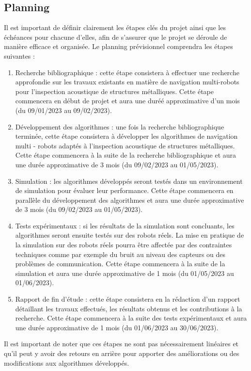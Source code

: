\documentclass[init,francais,RandD]{rapportPFE}  %
\begin{document}
		\subsection{Planning}
			Il est important de définir clairement les étapes clés du projet ainsi que les échéances pour chacune d'elles, afin de s'assurer que le projet se déroule de manière efficace et organisée. Le planning prévisionnel comprendra les étapes suivantes :
			\begin{enumerate}
				\item Recherche bibliographique : cette étape consistera à effectuer une recherche approfondie sur les travaux existants en matière de navigation multi-robots pour l'inspection acoustique de structures métalliques. Cette étape commencera en début de projet et aura une duréé approximative d'un mois (du 09/01/2023 au 09/02/2023).
				\item Développement des algorithmes : une fois la recherche bibliographique terminée, cette étape consistera à développer les algorithmes de navigation multi - robots adaptés à l'inspection acoustique de structures métalliques. Cette étape commencera à la suite de la recherche bibliographique et aura une durée approximative de 3 mois (du 09/02/2023 au 01/05/2023).
				\item Simulation : les algorithmes développés seront testés dans un environnement de simulation pour évaluer leur performance. Cette étape commencera en parallèle du développement des algorithmes et aura une durée approximative de 3 mois (du 09/02/2023 au 01/05/2023).
				\item Tests expérimentaux : si les résultats de la simulation sont concluants, les algorithmes seront ensuite testés sur des robots réels. La mise en pratique de la simulation sur des robots réels pourra être affectée par des contraintes techniques comme par exemple du bruit au niveau des capteurs ou des problèmes de communication. Cette étape commencera à la suite de la simulation et aura une durée approximative de 1 mois (du 01/05/2023 au 01/06/2023).
				\item Rapport de fin d'étude : cette étape consistera en la rédaction d'un rapport détaillant les travaux effectués, les résultats obtenus et les contributions à la recherche. Cette étape commencera à la suite des tests expérimentaux et aura une durée approximative de 1 mois (du 01/06/2023 au 30/06/2023).
			\end{enumerate}
			Il est important de noter que ces étapes ne sont pas nécessairement linéaires et qu'il peut y avoir des retours en arrière pour apporter des améliorations ou des modifications aux algorithmes développés.
\end{document}
